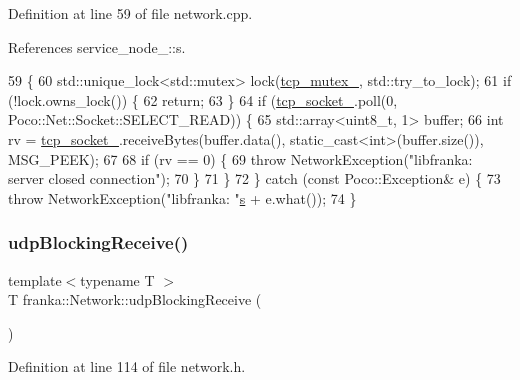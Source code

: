 Definition at line 59 of file network.\+cpp.



References service\+\_\+node\+\_\+::s.


\begin{DoxyCode}
59                                              \{
60   std::unique\_lock<std::mutex> lock(\hyperlink{classfranka_1_1Network_a8649d1cc6577ba09f7444c298905a11d}{tcp\_mutex\_}, std::try\_to\_lock);
61   \textcolor{keywordflow}{if} (!lock.owns\_lock()) \{
62     \textcolor{keywordflow}{return};
63   \}
64   \textcolor{keywordflow}{if} (\hyperlink{classfranka_1_1Network_a2c26c04f9ccb9792074799b101ee53e9}{tcp\_socket\_}.poll(0, Poco::Net::Socket::SELECT\_READ)) \{
65     std::array<uint8\_t, 1> buffer;
66     \textcolor{keywordtype}{int} rv = \hyperlink{classfranka_1_1Network_a2c26c04f9ccb9792074799b101ee53e9}{tcp\_socket\_}.receiveBytes(buffer.data(), \textcolor{keyword}{static\_cast<}\textcolor{keywordtype}{int}\textcolor{keyword}{>}(buffer.size()), MSG\_PEEK);
67 
68     \textcolor{keywordflow}{if} (rv == 0) \{
69       \textcolor{keywordflow}{throw} NetworkException(\textcolor{stringliteral}{"libfranka: server closed connection"});
70     \}
71   \}
72 \} \textcolor{keywordflow}{catch} (\textcolor{keyword}{const} Poco::Exception& e) \{
73   \textcolor{keywordflow}{throw} NetworkException(\textcolor{stringliteral}{"libfranka: "}\hyperlink{namespaceservice__node__3_aa976421a49e0b54f23833423400849ae}{s} + e.what());
74 \}
\end{DoxyCode}
\mbox{\label{classfranka_1_1Network_aa6400391cf1485866dc321e6ba3063ad}} 
\subsubsection{\texorpdfstring{udp\+Blocking\+Receive()}{udpBlockingReceive()}}
{\footnotesize\ttfamily template$<$typename T $>$ \\
T franka\+::\+Network\+::udp\+Blocking\+Receive (\begin{DoxyParamCaption}{ }\end{DoxyParamCaption})}



Definition at line 114 of file network.\+h.



